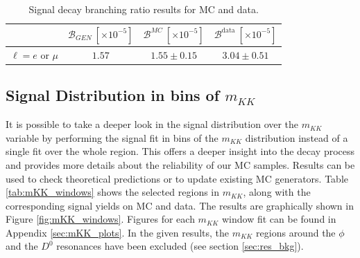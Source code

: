 \begin{table}[H]
	\centering
	\begin{tabular}{l|c|c|c}
		& $\mathcal{B}_{GEN}~[\times 10^{-5}]$ & $\mathcal{B}^{MC}~[\times 10^{-5}]$ & $\mathcal{B}^{\mathrm{data}}~[\times 10^{-5}]$ \\
		\toprule
		$\ell = e$ or $\mu$ & $1.57$ & $1.55 \pm 0.15$ & $3.04 \pm 0.51$\\
		\bottomrule
	\end{tabular}
	\captionsetup{width=.8\linewidth}
	\caption{Signal decay branching ratio results for MC and data.}
	\label{tab:br_result_sig}
\end{table}

\subsection{Signal Distribution in bins of \texorpdfstring{$m_{KK}$}{mKK}}

It is possible to take a deeper look in the signal distribution over the $m_{KK}$ variable by performing the signal fit in bins of the $m_{KK}$ distribution instead of a single fit over the whole region. This offers a deeper insight into the decay process and provides more details about the reliability of our MC samples. Results can be used to check theoretical predictions or to update existing MC generators. Table \ref{tab:mKK_windows} shows the selected regions in $m_{KK}$, along with the corresponding signal yields on MC and data. The results are graphically shown in Figure \ref{fig:mKK_windows}. Figures for each $m_{KK}$ window fit can be found in Appendix \ref{sec:mKK_plots}. In the given results, the $m_{KK}$ regions around the $\phi$ and the $D^0$ resonances have been excluded (see section \ref{sec:res_bkg}).

